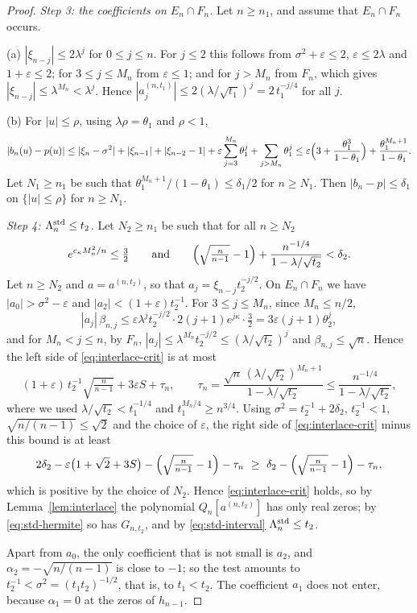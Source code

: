 \documentclass[11pt]{amsart}
\theoremstyle{definition}
\theoremstyle{remark}
\numberwithin{equation}{section}
\newcommand{\eps}{\varepsilon}
\begin{document}
\begin{proof}
\emph{Step 3: the coefficients on $E_n\cap F_n$.} Let $n\ge n_1$, and assume that $E_n\cap F_n$ occurs.

(a) $|\xi_{n-j}|\le2\lambda^j$ for $0\le j\le n$. For $j\le2$ this follows from $\sigma^2+\eps\le2$, $\eps\le2\lambda$ and $1+\eps\le2$; for $3\le j\le M_n$ from $\eps\le1$; and for $j>M_n$ from $F_n$, which gives $|\xi_{n-j}|\le\lambda^{M_n}<\lambda^j$. Hence $|a^{(n,t_1)}_j|\le2(\lambda/\sqrt{t_1})^j=2\,t_1^{-j/4}$ for all $j$.

(b) For $|u|\le\rho$, using $\lambda\rho=\theta_1$ and $\rho<1$,
\[
|b_n(u)-p(u)|\le|\xi_n-\sigma^2|+|\xi_{n-1}|+|\xi_{n-2}-1|+\eps\sum_{j=3}^{M_n}\theta_1^j+\sum_{j>M_n}\theta_1^j\le\eps\Bigl(3+\frac{\theta_1^3}{1-\theta_1}\Bigr)+\frac{\theta_1^{M_n+1}}{1-\theta_1}.
\]
Let $N_1\ge n_1$ be such that $\theta_1^{M_n+1}/(1-\theta_1)\le\delta_1/2$ for $n\ge N_1$. Then $|b_n-p|\le\delta_1$ on $\{|u|\le\rho\}$ for $n\ge N_1$.

\emph{Step 4: $\Lambda_n^{\rm std}\le t_2$.} Let $N_2\ge n_1$ be such that for all $n\ge N_2$
\[
e^{c_\kappa M_n^2/n}\le\tfrac32\qquad\text{and}\qquad\Bigl(\sqrt{\tfrac n{n-1}}-1\Bigr)+\frac{n^{-1/4}}{1-\lambda/\sqrt{t_2}}<\delta_2 .
\]
Let $n\ge N_2$ and $a=a^{(n,t_2)}$, so that $a_j=\xi_{n-j}t_2^{-j/2}$. On $E_n\cap F_n$ we have $|a_0|>\sigma^2-\eps$ and $|a_2|<(1+\eps)t_2^{-1}$. For $3\le j\le M_n$, since $M_n\le n/2$,
\[
|a_j|\,\beta_{n,j}\le\eps\lambda^jt_2^{-j/2}\cdot2(j+1)e^{j\kappa}\cdot\tfrac32=3\eps(j+1)\theta_2^j ,
\]
and for $M_n<j\le n$, by $F_n$, $|a_j|\le\lambda^{M_n}t_2^{-j/2}\le(\lambda/\sqrt{t_2})^j$ and $\beta_{n,j}\le\sqrt n$. Hence the left side of \eqref{eq:interlace-crit} is at most
\[
(1+\eps)\,t_2^{-1}\sqrt{\tfrac n{n-1}}+3\eps S+\tau_n,\qquad\tau_n=\frac{\sqrt n\,(\lambda/\sqrt{t_2})^{M_n+1}}{1-\lambda/\sqrt{t_2}}\le\frac{n^{-1/4}}{1-\lambda/\sqrt{t_2}},
\]
where we used $\lambda/\sqrt{t_2}<t_1^{-1/4}$ and $t_1^{M_n/4}\ge n^{3/4}$. Using $\sigma^2=t_2^{-1}+2\delta_2$, $t_2^{-1}<1$, $\sqrt{n/(n-1)}\le\sqrt2$ and the choice of $\eps$, the right side of \eqref{eq:interlace-crit} minus this bound is at least
\[
2\delta_2-\eps\bigl(1+\sqrt2+3S\bigr)-\Bigl(\sqrt{\tfrac n{n-1}}-1\Bigr)-\tau_n\ \ge\ \delta_2-\Bigl(\sqrt{\tfrac n{n-1}}-1\Bigr)-\tau_n ,
\]
which is positive by the choice of $N_2$. Hence \eqref{eq:interlace-crit} holds, so by Lemma~\ref{lem:interlace} the polynomial $Q_n[a^{(n,t_2)}]$ has only real zeros; by \eqref{eq:std-hermite} so has $G_{n,t_2}$, and by \eqref{eq:std-interval} $\Lambda_n^{\rm std}\le t_2$.

Apart from $a_0$, the only coefficient that is not small is $a_2$, and $\alpha_2=-\sqrt{n/(n-1)}$ is close to $-1$; so the test amounts to $t_2^{-1}<\sigma^2=(t_1t_2)^{-1/2}$, that is, to $t_1<t_2$. The coefficient $a_1$ does not enter, because $\alpha_1=0$ at the zeros of $h_{n-1}$.


\end{proof}
\end{document}
